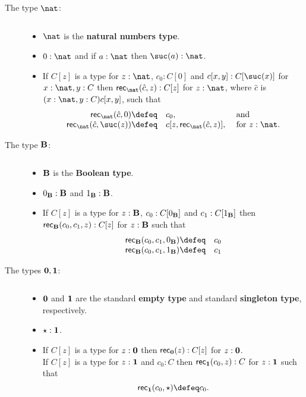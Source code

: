 {{\begin{description}
\item[The type $\nat$:] $\;$
\begin{itemize}
\item $\nat$ is the {\bf natural numbers type}.
\item $0:\nat$ and if $a:\nat$ then $\suc(a):\nat$.
\item If $C[z]$ is a type for $z:\nat$, $c_0:C[0]$ and $c[x,y]:C[\suc(x)]$ for $x:\nat,y:C$ then
$\rec_\nat(\hat{c},z):C[z]$ for $z:\nat$, where $\hat{c}$ is $(x:\nat,y:C)c[x,y]$,
such that
  \[ \begin{array}{rll}
\rec_\nat(\hat{c},0)      \defeq& c_0,                   &\mbox{ and}\\
\rec_\nat(\hat{c},\suc(z))\defeq& c[z,\rec_\nat(\hat{c},z)], &\mbox{ for } z:\nat .
  \end{array}\]
\end{itemize}


\item[The type ${\bf B}$:] $\;$
\begin{itemize}
\item ${\bf B}$ is the {\bf Boolean type}.
\item $0_{\bf B}:{\bf B}$ and $1_{\bf B}:{\bf B}$.
\item If $C[z]$ is a type for $z:{\bf B}$, $c_0:C[0_{\bf B}]$ 
and $c_1:C[1_{\bf B}]$ then ${\sf rec}_{\bf B}(c_0,c_1,z):C[z]$ for $z:{\bf B}$ such that
 \[ \begin{array}{rl}
\rec_\bool(c_0,c_1,0_\bool) \defeq& c_0\\
\rec_\bool(c_0,c_1,1_\bool) \defeq& c_1
  \end{array}\]
\end{itemize}

\item[The types ${\bf 0},{\bf 1}$:] $\;$
\begin{itemize}
\item ${\bf 0}$ and ${\bf 1}$ are the standard {\bf empty type} and standard 
{\bf singleton type}, respectively.
\item $\star :{\bf 1}$.
\item If $C[z]$ is a type for $z:{\bf 0}$ then ${\sf rec}_{\bf 0}(z):C[z]$ for $z:{\bf 0}$.\\  If $C[z]$ is a type for $z:{\bf 1}$ and $c_0:C$ then ${\sf rec}_{\bf 1}(c_0,z):C$ for $z:{\bf 1}$ such that 
  \[ \rec_\unitt(c_0,\star)\defeq c_0.\]

\end{itemize}

\end{description}
}%

}%

